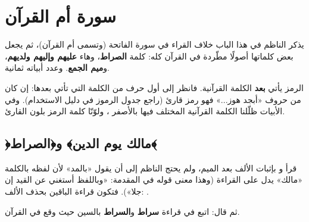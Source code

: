 \chapter{سورة أم القرآن}

يذكر الناظم في هذا الباب خلاف القراء في سورة الفاتحة (وتسمى أم القرآن)، ثم يجعل بعض كلماتها أصولًا مطّردة في القرآن كله: كلمة \textbf{الصراط}، وهاء \textbf{عليهم وإليهم ولديهم}، و\textbf{ميم الجمع}.
وعدد أبياته ثمانية.

\begin{tanbih}
الرمز يأتي \textbf{بعد} الكلمة القرآنية. فانظر إلى أول حرف من الكلمة التي تأتي بعدها: إن كان من حروف «أبجد هوز...» فهو رمز قارئ (راجع جدول الرموز في دليل الاستخدام).
وفي الأبيات ظلّلنا الكلمة القرآنية المختلف فيها بالأصفر ، ولوّنّا كلمة الرمز بلون القارئ.
\end{tanbih}

\section{﴿مالك يوم الدين﴾ و﴿الصراط﴾}

\begin{mufradat}
\end{mufradat}

\maana
قرأ \Kisai{} و\Asim{}  بإثبات الألف بعد الميم، ولم يحتج الناظم إلى أن يقول «بالمد» لأن لفظه بالكلمة «مالك» يدل على القراءة (وهذا معنى قوله في المقدمة: «وباللفظ أستغني عن القيد إن جلا»).
فتكون قراءة الباقين بحذف الألف: .

ثم قال: اتبع \Qunbul{} في قراءة \textbf{سراط} و\textbf{السراط} بالسين حيث وقع في القرآن.

\begin{qiraat}
\end{qiraat}

